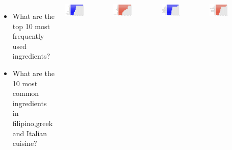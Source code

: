 \documentclass{tikzposter} %
\begin{document}
\begin{columns}
{\begin{itemize}
    \end{itemize}
    
    \begin{itemize}                            
        \item
        What are the top 10 most frequently used ingredients?
        \item What are the 10 most common ingredients in filipino,greek and Italian cuisine?
    \end{itemize}
    \begin{minipage}{0.5\linewidth}
        \centering
        \includegraphics[width=0.5\textwidth]{pic1/cooking.png} 
    \end{minipage}
    \begin{minipage}{0.5\linewidth}
        \centering
        \includegraphics[width=0.5\textwidth]{pic1/filipino.png} 
    \end{minipage}
    \begin{minipage}{0.5\linewidth}
        \centering
        \includegraphics[width=0.5\textwidth]{pic1/greek.png} 
    \end{minipage}
    \begin{minipage}{0.5\linewidth}
        \centering
        \includegraphics[width=0.5\textwidth]{pic1/italian.png} 
    \end{minipage}
   
}
\end{columns}
\end{document}
